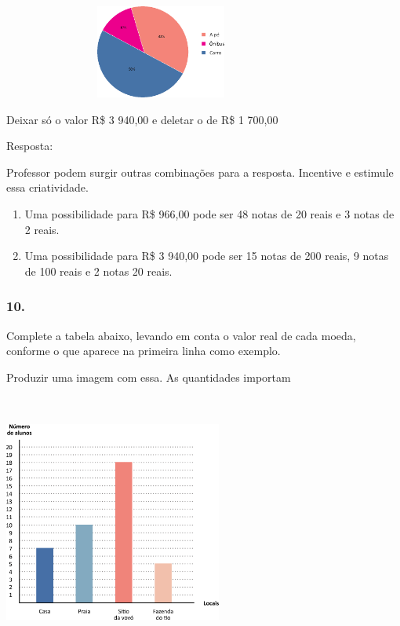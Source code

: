\includegraphics[width=4.10036in,height=1.20844in]{media/image78.png}

Deixar só o valor R\$ 3 940,00 e deletar o de R\$ 1 700,00

Resposta:

Professor podem surgir outras combinações para a resposta. Incentive e
estimule essa criatividade.

\begin{enumerate}
\def\labelenumi{\alph{enumi})}
\item
  Uma possibilidade para R\$ 966,00 pode ser 48 notas de 20 reais e 3
  notas de 2 reais.
\item
  Uma possibilidade para R\$ 3 940,00 pode ser 15 notas de 200 reais, 9
  notas de 100 reais e 2 notas 20 reais.
\end{enumerate}

\subsubsection{10.}\label{section-89}

Complete a tabela abaixo, levando em conta o valor real de cada moeda,
conforme o que aparece na primeira linha como exemplo.

Produzir uma imagem com essa. As quantidades importam

\includegraphics[width=2.82051in,height=3.34367in]{media/image79.png}

